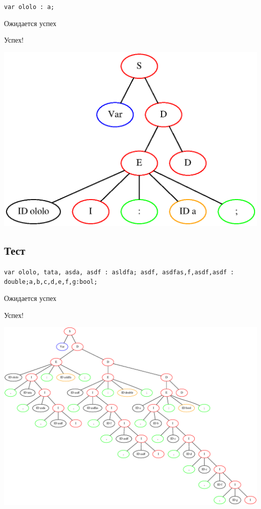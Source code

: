 \texttt{var ololo : a;}

Ожидается успех

Успех! 

\includegraphics[width=\textwidth]{test13.eps}

\subsection{Тест }

\texttt{var ololo, tata, asda, asdf : asldfa; asdf, asdfas,f,asdf,asdf : double;a,b,c,d,e,f,g:bool;}

Ожидается успех

Успех! 

\includegraphics[width=\textwidth]{test14.eps}

